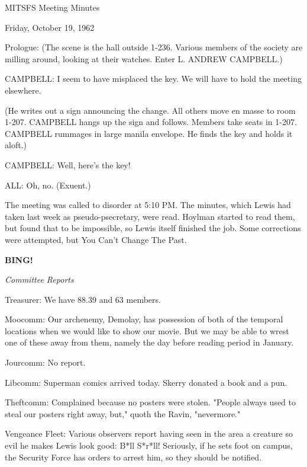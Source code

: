 \documentclass[12pt]{article}
\newcommand{\bing}{{\bf BING!} }
\newcommand{\goto}[1]{\bing \vskip 12pt \centerline{{\em{#1}}}}
\begin{document}
\begin{center}

MITSFS Meeting Minutes

Friday, October 19, 1962

\end{center}
 
\vspace{12pt}

\setlength{\parskip}{6pt}

\noindent
Prologue: (The scene is the hall outside 1-236. Various members of the society are milling around, looking at their watches. Enter L. ANDREW CAMPBELL.)

CAMPBELL: I seem to have misplaced the key. We will have to hold the meeting elsewhere.

(He writes out a sign announcing the change. All others move en masse to room 1-207. CAMPBELL hangs up the sign and follows. Members take seats in 1-207. CAMPBELL rummages in large manila envelope. He finds the key and holds it aloft.)

CAMPBELL: Well, here's the key!

ALL: Oh, no. (Exuent.)

The meeting was called to disorder at 5:10 PM. The minutes, which Lewis had taken last week as pseudo-psecretary, were read. Hoylman started to read them, but found that to be impossible, so Lewis itself finished the job. Some corrections were attempted, but You Can't Change The Past.

\goto{Committee Reports}

Treasurer: We have 88.39 and 63 members.

Moocomm: Our archenemy, Demolay, has possession of both of the temporal locations when we would like to show our movie. But we may be able to wrest one of these away from them, namely the day before reading period in January.

Jourcomm: No report.

Libcomm: Superman comics arrived today. Skerry donated a book and a pun.

Theftcomm: Complained because no posters were stolen. "People always used to steal our posters right away, but," quoth the Ravin, "nevermore."

Vengeance Fleet: Various observers report having seen in the area a creature so evil he makes Lewis look good: B*ll S*r*ll! Seriously, if he sets foot on campus, the Security Force has orders to arrest him, so they should be notified.
\end{document}
